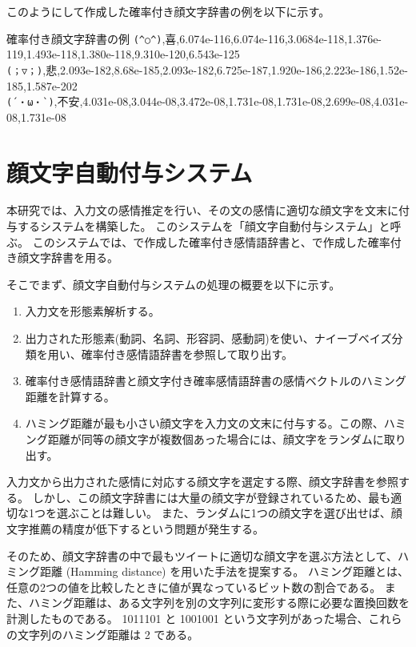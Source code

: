 \documentclass[11pt,a4j]{jsarticle}
\begin{document}
このようにして作成した確率付き顔文字辞書の例を以下に示す。

\begin{itembox}[l]{確率付き顔文字辞書の例}
\verb|(^○^)|,喜,6.074e-116,6.074e-116,3.0684e-118,1.376e-119,1.493e-118,1.380e-118,9.310e-120,6.543e-125\\
\verb|(；▽；)|,悲,2.093e-182,8.68e-185,2.093e-182,6.725e-187,1.920e-186,2.223e-186,1.52e-185,1.587e-202\\
\verb|(´・ω・`)|,不安,4.031e-08,3.044e-08,3.472e-08,1.731e-08,1.731e-08,2.699e-08,4.031e-08,1.731e-08\\
\end{itembox}

\section{顔文字自動付与システム}
本研究では、入力文の感情推定を行い、その文の感情に適切な顔文字を文末に付与するシステムを構築した。
このシステムを「顔文字自動付与システム」と呼ぶ。%
このシステムでは、で作成した確率付き感情語辞書と、で作成した確率付き顔文字辞書を用る。

そこでまず、顔文字自動付与システムの処理の概要を以下に示す。

\begin{enumerate}
  \item 入力文を形態素解析する。
  \item 出力された形態素(動詞、名詞、形容詞、感動詞)を使い、ナイーブベイズ分類を用い、確率付き感情語辞書を参照して取り出す。
  \item 確率付き感情語辞書と顔文字付き確率感情語辞書の感情ベクトルのハミング距離を計算する。
  \item ハミング距離が最も小さい顔文字を入力文の文末に付与する。この際、ハミング距離が同等の顔文字が複数個あった場合には、顔文字をランダムに取り出す。
\end{enumerate}

入力文から出力された感情に対応する顔文字を選定する際、顔文字辞書を参照する。
しかし、この顔文字辞書には大量の顔文字が登録されているため、最も適切な1つを選ぶことは難しい。
また、ランダムに1つの顔文字を選び出せば、顔文字推薦の精度が低下するという問題が発生する。

そのため、顔文字辞書の中で最もツイートに適切な顔文字を選ぶ方法として、ハミング距離 (Hamming distance) を用いた手法を提案する。
ハミング距離とは、任意の2つの値を比較したときに値が異なっているビット数の割合である。
また、ハミング距離は、ある文字列を別の文字列に変形する際に必要な置換回数を計測したものである。
1011101 と 1001001 という文字列があった場合、これらの文字列のハミング距離は 2 である。
\end{document}
